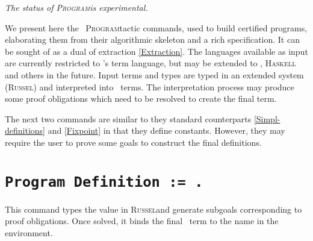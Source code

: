 \def\Program{\textsc{Program}}
\def\Russel{\textsc{Russel}}

\achapter{The \Program{} tactic}
\label{Program}

\begin{flushleft}
  \em The status of \Program is experimental.
\end{flushleft}

We present here the \Coq\ \Program tactic commands, used to build certified
\Coq programs, elaborating them from their algorithmic skeleton and a
rich specification. It can be sought of as a dual of extraction \ref{Extraction}.
The languages available as input are currently restricted to \Coq's term
language, but may be extended to \ocaml{}, \textsc{Haskell} and others
in the future. Input terms and types are typed in an extended system (\Russel) and
interpreted into \Coq\ terms. The interpretation process may produce
some proof obligations which need to be resolved to create the final term.


The next two commands are similar to they standard counterparts
\ref{Simpl-definitions} and \ref{Fixpoint} in that
they define constants. However, they may require the user to prove some
goals to construct the final definitions.

\section{\tt Program Definition {\ident} := {\term}.
  \label{ProgramDefinition}}

This command types the value {\term} in \Russel and generate subgoals
corresponding to proof obligations. Once solved, it binds the final
\Coq\ term to the name {\ident} in the environment.

\begin{ErrMsgs}
\item {}
\end{ErrMsgs}

